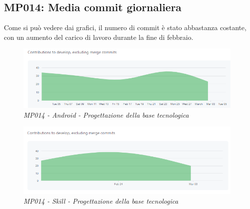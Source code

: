 \subsection{MP014: Media commit giornaliera}
Come si può vedere dai grafici, il numero di commit è stato abbastanza costante, con un aumento del carico di lavoro durante la fine di febbraio.
\begin{figure} [h]
    \centering
	\includegraphics[scale=0.5]{./images/dailycommits_kotlin.PNG}
    \caption{\textit{MP014 - Android - Progettazione della base tecnologica}}
\end{figure}
\begin{figure} [h]
    \centering
	\includegraphics[scale=0.5]{./images/daycommits_js.PNG}
    \caption{\textit{MP014 - Skill - Progettazione della base tecnologica}}
\end{figure}

